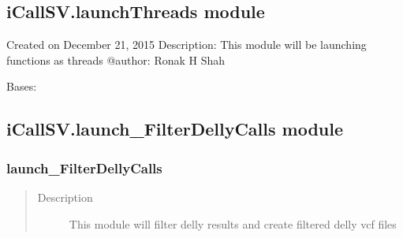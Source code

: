 \documentclass[letterpaper,10pt,english]{sphinxmanual}
\begin{document}
\subsection{iCallSV.launchThreads module}
\label{iCallSV:icallsv-launchthreads-module}\label{iCallSV:module-iCallSV.launchThreads}
Created on December 21, 2015
Description: This module will be launching functions as threads
@author: Ronak H Shah

\begin{fulllineitems}
\label{iCallSV:iCallSV.launchThreads.myThread}
Bases: 

\begin{fulllineitems}
\label{iCallSV:iCallSV.launchThreads.myThread.run}
\end{fulllineitems}


\end{fulllineitems}


\begin{fulllineitems}
\label{iCallSV:iCallSV.launchThreads.print_time}
\end{fulllineitems}



\subsection{iCallSV.launch\_FilterDellyCalls module}
\label{iCallSV:module-iCallSV.launch_FilterDellyCalls}\label{iCallSV:icallsv-launch-filterdellycalls-module}

\subsubsection{launch\_FilterDellyCalls}
\label{iCallSV:launch-filterdellycalls}\begin{quote}\begin{description}
\item[{Description}] \leavevmode
This module will filter delly results and create filtered delly vcf files

\end{description}\end{quote}
\end{document}
